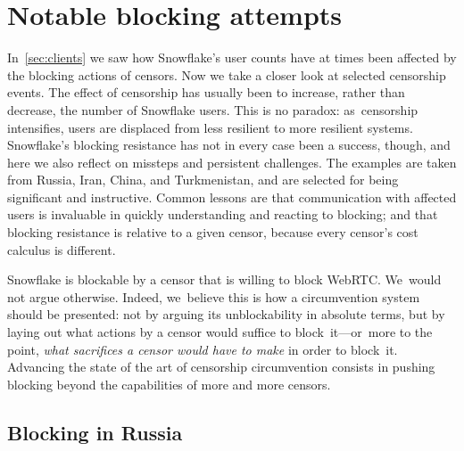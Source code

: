 \documentclass[letterpaper,twocolumn]{article}
\begin{document}

\section{Notable blocking attempts}
\label{sec:block}

In~\autoref{sec:clients} we saw how Snowflake's user counts
have at times been affected by the blocking actions of censors.
Now we take a closer look at selected censorship events.
The effect of censorship has usually been to increase, rather than decrease,
the number of Snowflake users.
This is no paradox:
as~censorship intensifies,
users are displaced from less resilient
to more resilient systems.
Snowflake's blocking resistance has not in every case been a success,
though, and here we also reflect on missteps
and persistent challenges.
The examples are taken from
Russia, Iran, China, and Turkmenistan,
and are selected for being significant and instructive.
Common lessons are that communication
with affected users is invaluable in quickly understanding and reacting to blocking;
and that blocking resistance is relative to a given censor,
because every censor's cost calculus is different.

Snowflake is blockable by a censor that is willing to block WebRTC.
We~would not argue otherwise.
Indeed, we~believe this is how a circumvention system
should be presented:
not by arguing its unblockability in absolute terms,
but by laying out
what actions by a censor would suffice to block~it---or~more
to the point,
\emph{what sacrifices a censor would have to make}
in order to block~it.
Advancing the state of the art of censorship circumvention
consists in pushing blocking
beyond the capabilities of more and more censors.

\subsection{Blocking in Russia}
\label{sec:block-ru}
\end{document}
